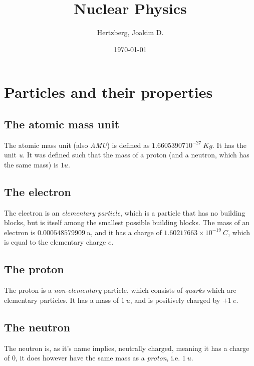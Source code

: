 \documentclass[12pt]{article}
\title{Nuclear Physics}
\author{Hertzberg, Joakim D.}
\date{\today}
\begin{document}
\begin{titlepage}
\maketitle
\begin{center}
\thispagestyle{empty}
\end{center}
\end{titlepage}

\tableofcontents

\newpage

\section{Particles and their properties}
\subsection{The atomic mass unit}

The atomic mass unit (also \emph{AMU}) is defined as $1.66053907 10^{-27} \ Kg$. It has the unit \emph{u}.
It was defined such that the mass of a proton (and a neutron, which has the same mass) is $1u$.

\subsection{The electron}

The electron is an \emph{elementary particle}, which is a particle that has no building blocks, but is itself among the smallest possible building blocks.
The mass of an electron is $0.000548579909 \ u$, and it has a charge of $1.60217663 \times 10^{-19} \ C$, which is equal to the elementary charge $e$.

\subsection{The proton}
The proton is a \emph{non-elementary} particle, which consists of \emph{quarks} which are elementary particles. It has a mass of $1 \ u$, and is positively charged by $+1 \ e$.

\subsection{The neutron}
The neutron is, as it's name implies, neutrally charged, meaning it has a charge of $0$, it does however have the same mass as a \emph{proton}, i.e. $1 \ u$.
\end{document}
